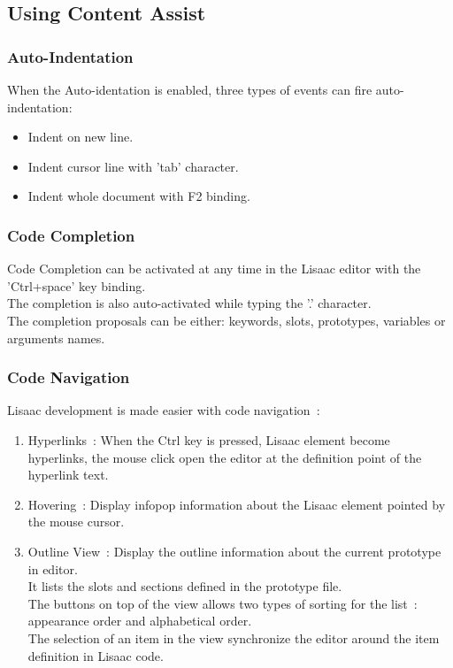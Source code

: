 \documentclass{article}
\begin{document}
\subsection{Using Content Assist} 
\subsubsection{Auto-Indentation} 

When the Auto-identation is enabled, three types of events can fire auto-indentation:
\begin{itemize}
\item{Indent on new line.}
\item{Indent cursor line with 'tab' character.}
\item{Indent whole document with F2 binding.}
\end{itemize}

\subsubsection{Code Completion} 

Code Completion can be activated at any time in the Lisaac editor with
the 'Ctrl+space' key binding.\\
The completion is also auto-activated while typing the '.' character.\\

The completion proposals can be either: keywords, slots, prototypes, variables or arguments names.

\subsubsection{Code Navigation} 

Lisaac development is made easier with code navigation~:
\begin{enumerate}
\item{Hyperlinks~: When the Ctrl key is pressed, Lisaac element become hyperlinks, the mouse click open the editor at the definition point of the hyperlink text.}
\item{Hovering~: Display infopop information about the Lisaac element pointed by the mouse cursor.
} 
\item{Outline View~: Display the outline information about the current prototype in editor.\\
It lists the slots and sections defined in the prototype file.\\
The buttons on top of the view allows two types of sorting for the list~: appearance order and alphabetical order.\\
The selection of an item in the view synchronize the editor around the item definition in Lisaac code.
}
\end{enumerate}
  
\end{document}
